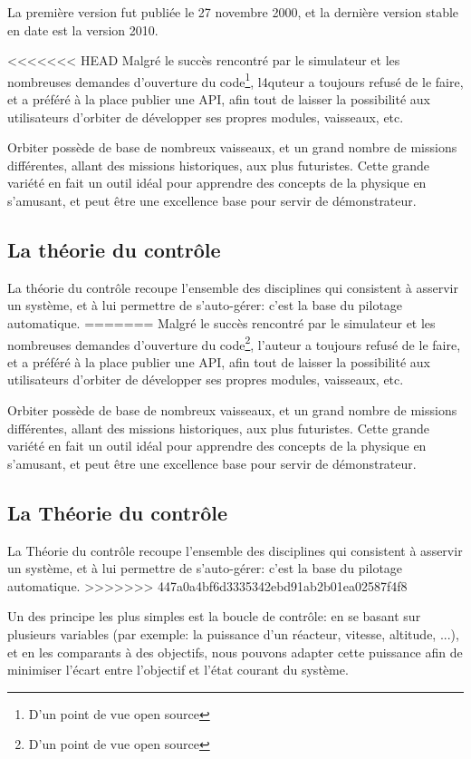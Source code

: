 \documentclass[a4paper,11pt]{article}
\begin{document}
        La première version fut publiée le 27 novembre 2000, et la dernière version stable en date est la version 2010.

<<<<<<< HEAD
        Malgré le succès rencontré par le simulateur et les nombreuses demandes d'ouverture du code\footnote{D'un point de vue open source}, l4quteur a toujours refusé de le faire, et a préféré à la place publier une API, afin tout de laisser la possibilité aux utilisateurs d'orbiter de développer ses propres modules, vaisseaux, etc.

        Orbiter possède de base de nombreux vaisseaux, et un grand nombre de missions différentes, allant des missions historiques, aux plus futuristes. Cette grande variété en fait un outil idéal pour apprendre des concepts de la physique en s'amusant, et peut être une excellence base pour servir de démonstrateur.

    \subsection{La théorie du contrôle}
        La théorie du contrôle recoupe l'ensemble des disciplines qui consistent à asservir un système, et à lui permettre de s'auto-gérer: c'est la base du pilotage automatique.
=======
        Malgré le succès rencontré par le simulateur et les nombreuses demandes d'ouverture du code\footnote{D'un point de vue open source}, l'auteur a toujours refusé de le faire, et a préféré à la place publier une API, afin tout de laisser la possibilité aux utilisateurs d'orbiter de développer ses propres modules, vaisseaux, etc.

        Orbiter possède de base de nombreux vaisseaux, et un grand nombre de missions différentes, allant des missions historiques, aux plus futuristes. Cette grande variété en fait un outil idéal pour apprendre des concepts de la physique en s'amusant, et peut être une excellence base pour servir de démonstrateur.

    \subsection{La Théorie du contrôle}
        La Théorie du contrôle recoupe l'ensemble des disciplines qui consistent à asservir un système, et à lui permettre de s'auto-gérer: c'est la base du pilotage automatique.
>>>>>>> 447a0a4bf6d3335342ebd91ab2b01ea02587f4f8

        Un des principe les plus simples est la boucle de contrôle: en se basant sur plusieurs variables (par exemple: la puissance d'un réacteur, vitesse, altitude, ...), et en les comparants à des objectifs, nous pouvons adapter cette puissance afin de minimiser l'écart entre l'objectif et l'état courant du système.
\end{document}
